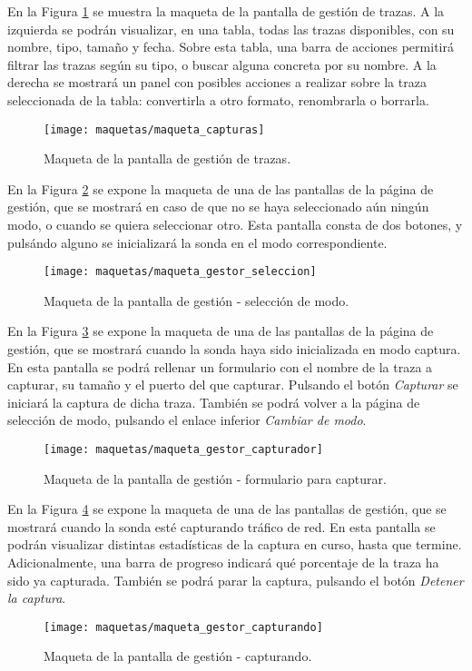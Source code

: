 En la Figura \ref{fig:maqueta:capturas} se muestra la maqueta de la pantalla de gestión de \glspl{traza}.
A la izquierda se podrán visualizar, en una tabla, todas las \glspl{traza} disponibles, con su nombre, tipo, tamaño y fecha.
Sobre esta tabla, una barra de acciones permitirá filtrar las \glspl{traza} según su tipo, o buscar alguna concreta por su nombre.
A la derecha se mostrará un panel con posibles acciones a realizar sobre la \gls{traza} seleccionada de la tabla: convertirla a otro formato, renombrarla o borrarla. 
\begin{figure}[!htp]
  \centering
  \texttt{[image: maquetas/maqueta\_capturas]}
  \caption{Maqueta de la pantalla de gestión de \glspl{traza}.}
  \label{fig:maqueta:capturas}
\end{figure}
\clearpage

En la Figura \ref{fig:maqueta:gestor_seleccion} se expone la maqueta de una de las pantallas de la página de gestión, que se mostrará en caso de que no se haya seleccionado aún ningún modo, o cuando se quiera seleccionar otro.
Esta pantalla consta de dos botones, y pulsándo alguno se inicializará la sonda en el modo correspondiente.
\begin{figure}[!htp]
  \centering
  \texttt{[image: maquetas/maqueta\_gestor\_seleccion]}
  \caption{Maqueta de la pantalla de gestión - selección de modo.}
  \label{fig:maqueta:gestor_seleccion}
\end{figure}
\clearpage

En la Figura \ref{fig:maqueta:gestor_capturador} se expone la maqueta de una de las pantallas de la página de gestión, que se mostrará cuando la sonda haya sido inicializada en modo captura.
En esta pantalla se podrá rellenar un formulario con el nombre de la \gls{traza} a capturar, su tamaño y el puerto del que capturar.
Pulsando el botón \textit{Capturar} se iniciará la captura de dicha \gls{traza}. También se podrá volver a la página de selección de modo, pulsando el enlace inferior \textit{Cambiar de modo}.
\begin{figure}[!htp]
  \centering
  \texttt{[image: maquetas/maqueta\_gestor\_capturador]}
  \caption{Maqueta de la pantalla de gestión - formulario para capturar.}
  \label{fig:maqueta:gestor_capturador}
\end{figure}
\clearpage

En la Figura \ref{fig:maqueta:gestor_capturando} se expone la maqueta de una de las pantallas de gestión, que se mostrará cuando la sonda esté capturando tráfico de red.
En esta pantalla se podrán visualizar distintas estadísticas de la captura en curso, hasta que termine.
Adicionalmente, una barra de progreso indicará qué porcentaje de la \gls{traza} ha sido ya capturada.
También se podrá parar la captura, pulsando el botón \textit{Detener la captura}.
\begin{figure}[!htp]
  \centering
  \texttt{[image: maquetas/maqueta\_gestor\_capturando]}
  \caption{Maqueta de la pantalla de gestión - capturando.}
  \label{fig:maqueta:gestor_capturando}
\end{figure}
\clearpage

